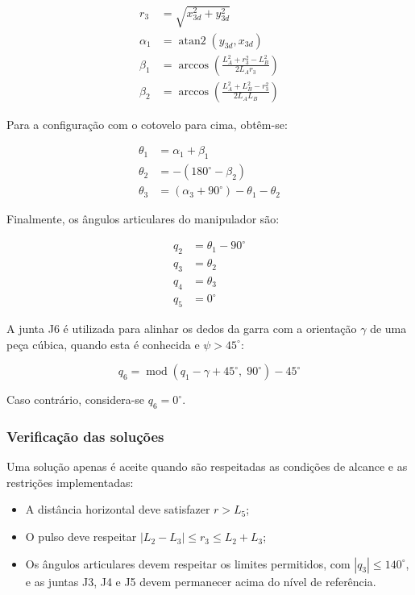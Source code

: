 \begin{align*}
    r_3 &= \sqrt{x_{3d}^2+y_{3d}^2}\\
    \alpha_1 &= \operatorname{atan2}(y_{3d},x_{3d})\\
    \beta_1 &= \arccos\left(
    \frac{L_A^2+r_3^2-L_B^2}{2L_A r_3}
    \right)\\
    \beta_2 &= \arccos\left(
    \frac{L_A^2+L_B^2-r_3^2}{2L_A L_B}
    \right)
\end{align*}

Para a configuração com o cotovelo para cima, obtêm-se:

\begin{align*}
    \theta_1 &= \alpha_1+\beta_1\\
    \theta_2 &= -(180^\circ-\beta_2)\\
    \theta_3 &= (\alpha_3+90^\circ)-\theta_1-\theta_2
\end{align*}

Finalmente, os ângulos articulares do manipulador são:

\begin{equation}
    \boxed{
    \begin{aligned}
        q_2 &= \theta_1-90^\circ\\
        q_3 &= \theta_2\\
        q_4 &= \theta_3\\
        q_5 &= 0^\circ
    \end{aligned}
    }
    \label{eq:ik_final}
\end{equation}

A junta J6 é utilizada para alinhar os dedos da garra com a orientação $\gamma$ de uma peça cúbica, quando esta é conhecida e $\psi>45^\circ$:

\begin{equation}
    q_6=
    \operatorname{mod}(q_1-\gamma+45^\circ,\;90^\circ)
    -45^\circ
\end{equation}

Caso contrário, considera-se $q_6=0^\circ$.

\subsubsection*{Verificação das soluções}

Uma solução apenas é aceite quando são respeitadas as condições de alcance e as restrições implementadas:

\begin{itemize}
    \item A distância horizontal deve satisfazer $r>L_5$;
    \item O pulso deve respeitar $|L_2-L_3|\leq r_3\leq L_2+L_3$;
    \item Os ângulos articulares devem respeitar os limites permitidos, com $|q_3|\leq140^\circ$, e as juntas J3, J4 e J5 devem permanecer acima do nível de referência.
\end{itemize}

